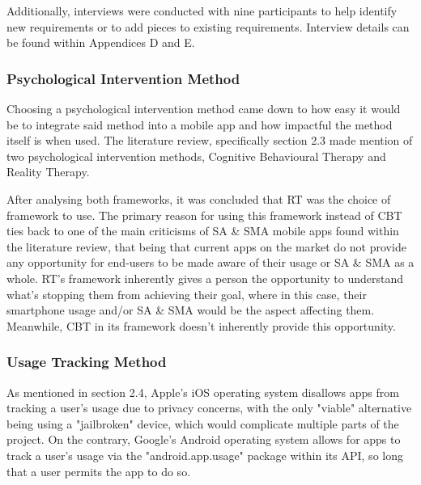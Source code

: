 \documentclass[12pt]{article}
\begin{document}

Additionally, interviews were conducted with nine participants to help identify new requirements or 
to add pieces to existing requirements. 
Interview details can be found within Appendices D and E. \newline

\subsubsection{Psychological Intervention Method}

Choosing a psychological intervention method came down to how easy it would be to integrate said method into a mobile app and how impactful the method itself is when used. The literature review,
specifically section 2.3 made mention of two psychological intervention methods, Cognitive Behavioural Therapy and Reality Therapy. \newline

After analysing both frameworks, it was concluded that RT was the choice of framework to use. The primary reason for using this framework instead of CBT ties back to one of the main criticisms
of SA \& SMA mobile apps found within the literature review, that being that current apps on the market do not provide any opportunity for end-users to be made aware of their usage or SA \& SMA
as a whole. RT's framework inherently gives a person the opportunity to understand what's stopping them from achieving their goal, where in this
case, their smartphone usage and/or SA \& SMA would be the aspect affecting them. Meanwhile, CBT in its framework doesn't inherently provide this opportunity. \newline

\subsubsection{Usage Tracking Method}


As mentioned in section 2.4, Apple's iOS operating system disallows apps from tracking a user's usage
due to privacy concerns, with the only "viable" alternative being using a "jailbroken" device, which would complicate multiple parts of the project. On the contrary, Google's Android operating system
allows for apps to track a user's usage via the "android.app.usage" package within its API, so long that a user permits the app to do so.
\end{document}
